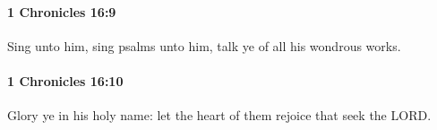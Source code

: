 		\paragraph{1 Chronicles 16:9} %
			\label{1CHRONICLES-16-9}

			Sing unto him, sing psalms unto him, talk ye of all his wondrous works.


		\paragraph{1 Chronicles 16:10} %
			\label{1CHRONICLES-16-10}

			Glory ye in his holy name: let the heart of them rejoice that seek the LORD.


